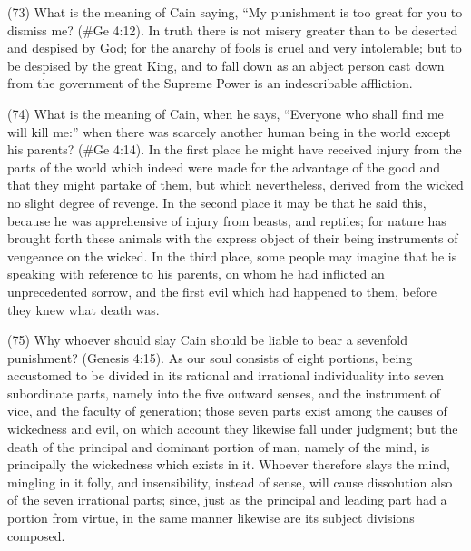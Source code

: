 (73) What is the meaning of Cain saying, ``My punishment is too great for you to dismiss me?
(\#Ge 4:12). In truth there is not misery greater than to be deserted and despised by God; for
the anarchy of fools is cruel and very intolerable; but to be despised by the great King, and to fall
down as an abject person cast down from the government of the Supreme Power is an
indescribable affliction.

(74) What is the meaning of Cain, when he says, ``Everyone who shall find me will kill me:'' when
there was scarcely another human being in the world except his parents? (\#Ge 4:14). In the
first place he might have received injury from the parts of the world which indeed were made for the
advantage of the good and that they might partake of them, but which nevertheless, derived from
the wicked no slight degree of revenge. In the second place it may be that he said this, because he
was apprehensive of injury from beasts, and reptiles; for nature has brought forth these animals
with the express object of their being instruments of vengeance on the wicked. In the third place,
some people may imagine that he is speaking with reference to his parents, on whom he had
inflicted an unprecedented sorrow, and the first evil which had happened to them, before they knew
what death was.

(75) Why whoever should slay Cain should be liable to bear a sevenfold punishment? (Genesis
4:15). As our soul consists of eight portions, being accustomed to be divided in its rational and
irrational individuality into seven subordinate parts, namely into the five outward senses, and the
instrument of vice, and the faculty of generation; those seven parts exist among the causes of
wickedness and evil, on which account they likewise fall under judgment; but the death of the
principal and dominant portion of man, namely of the mind, is principally the wickedness which
exists in it. Whoever therefore slays the mind, mingling in it folly, and insensibility, instead of sense,
will cause dissolution also of the seven irrational parts; since, just as the principal and leading part
had a portion from virtue, in the same manner likewise are its subject divisions composed.

